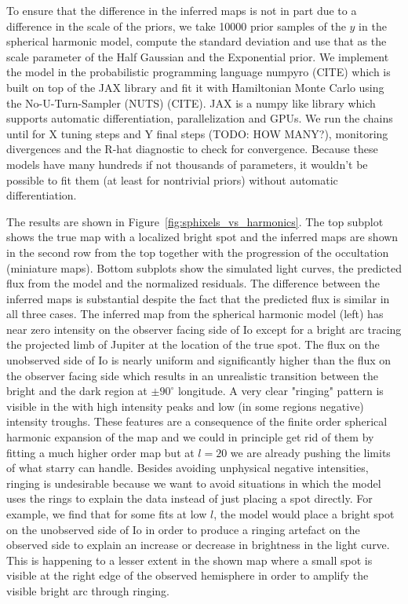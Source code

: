 \documentclass[modern]{aastex62}
\begin{document}
To ensure that the difference in the inferred maps is not in part due to a difference in the scale of the priors, we take 10000 prior samples of the $y$ in the spherical harmonic model, compute the standard deviation and use that as the scale parameter of the Half Gaussian and the Exponential prior.
We implement the model in the probabilistic programming language \textsf{numpyro} (CITE) which is built on top of the \textsf{JAX} library and fit it with Hamiltonian Monte Carlo using the No-U-Turn-Sampler (NUTS) (CITE).
\textsf{JAX} is a \textsf{numpy} like library which supports automatic differentiation, parallelization and GPUs.
We run the chains until for X tuning steps and Y final steps (TODO: HOW MANY?), monitoring divergences and the R-hat  diagnostic to check for convergence.
Because these models have many hundreds if not thousands of parameters, it wouldn't be possible to fit them (at least for nontrivial priors) without automatic differentiation.

The results are shown in Figure~\ref{fig:sphixels_vs_harmonics}.
The top subplot shows the true map with a localized bright spot and the 
inferred maps are shown in the second row from the top together with the progression of the occultation (miniature maps). 
Bottom subplots show the simulated light curves, the predicted flux from the model and the normalized residuals.
The difference between the inferred maps is substantial despite the fact that the predicted flux is similar in all three cases.
The inferred map from the spherical harmonic model (left) has near zero intensity on the observer facing side of Io except for a bright arc tracing the projected limb of Jupiter at the location of the true spot.
The flux on the unobserved side of Io is nearly uniform and significantly higher than the flux on the observer facing side which results in an unrealistic transition between the bright and the dark region at $\pm 90^\circ$ longitude. 
A very clear "ringing" pattern is visible in the with high intensity peaks and low (in some regions negative) intensity troughs.
These features are a consequence of the finite order spherical harmonic expansion of the map and we could in principle get rid of them by fitting a much higher order map but at $l=20$ we are already pushing the limits of what \textsf{starry} can handle.
Besides avoiding unphysical negative intensities, ringing is undesirable because we want to avoid situations in which the model uses the rings to explain the data instead of just placing a spot directly. 
For example, we find that for some fits at low $l$, the model would place a bright spot on the unobserved side of Io in order to produce a ringing artefact on the observed side to explain an increase or decrease in brightness in the light curve. 
This is happening to a lesser extent in the shown map where a small spot is visible at the right edge of the observed hemisphere in order to amplify the visible bright arc through ringing.
\end{document}
